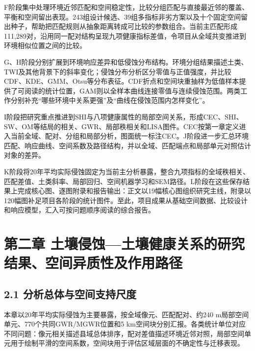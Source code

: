 \documentclass[
  11pt,
  a4paper,
]{ctexart}
\begin{document}
F阶段集中处理环境近邻匹配和空间稳定性，比较分组匹配与直接最近邻的覆盖、平衡和空间留出表现。243组设计候选、39组多指标非劣方案以及十个固定空间留出种子，帮助把匹配规则从抽象距离转成可比较的参数组合。当前主匹配形成111,289对，沿用同一配对结构呈现九项健康指标差值，令项目从全域共变推进到环境相似位置之间的比较。

G、H阶段分别扩展到环境响应差异和低侵蚀分布结构。环境分组结果描述土类、TWI及其他背景下的斜率变化；侵蚀分布分析区分零值与正值强度，并比较CDF、KDE、GMM、Otsu等分布表征。CDF折点和空间块重抽样为低值样本提供了可阅读的统计位置，GAM则以全样本曲线连接零值与连续侵蚀范围。两类工作分别补充``哪些环境中关系更强''及``曲线在侵蚀范围内怎样变化''。

I阶段把研究重点推进到SHI与八项健康属性的局部空间关系，形成CEC、SHI、SW、OM等结局的相关、GWR、局部秩相关和LISA图件。CEC按第一章定义进入当前全域、配对、分组和局部分析，图面统一标注CEC。J阶段进一步汇总环境匹配、响应曲线、空间系数及路径结构，并以全域、匹配端点和局部单元对照估计对象的差异。

K阶段将20年平均实际侵蚀固定为当前主分析暴露，整合九项指标的全域秩相关、匹配差值、土类斜率、局部回归、空间机器学习和SEM路径。L阶段在这些保存结果上完成核心图、逐图附录和报告输出：正文以19幅核心图组织研究主线，附录以120幅图补足项目各阶段的统计图件。至此，项目成果从基础空间数据、比较设计和响应模型，汇入可按问题顺序阅读的综合报告。

\hypertarget{ux7b2cux4e8cux7ae0-ux571fux58e4ux4fb5ux8680ux571fux58e4ux5065ux5eb7ux5173ux7cfbux7684ux7814ux7a76ux7ed3ux679cux7a7aux95f4ux5f02ux8d28ux6027ux53caux4f5cux7528ux8defux5f84}{%
\section{第二章
土壤侵蚀---土壤健康关系的研究结果、空间异质性及作用路径}\label{ux7b2cux4e8cux7ae0-ux571fux58e4ux4fb5ux8680ux571fux58e4ux5065ux5eb7ux5173ux7cfbux7684ux7814ux7a76ux7ed3ux679cux7a7aux95f4ux5f02ux8d28ux6027ux53caux4f5cux7528ux8defux5f84}}

\hypertarget{ux5206ux6790ux603bux4f53ux4e0eux7a7aux95f4ux652fux6301ux5c3aux5ea6}{%
\subsection{2.1
分析总体与空间支持尺度}\label{ux5206ux6790ux603bux4f53ux4e0eux7a7aux95f4ux652fux6301ux5c3aux5ea6}}

本章以20年平均实际侵蚀为主要暴露，按全域像元、匹配配对、约240
m局部空间单元、770个共同GWR/MGWR位置和5
km空间块分别汇报。各类统计单位对应不同问题：像元相关描述县域总体排序，配对差值描述环境近邻对照，局部空间单元用于绘制平滑的空间系数，空间块用于评估区域层面的不确定性与迁移表现。
\end{document}

